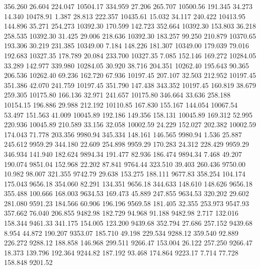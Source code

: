  356.260   26.604  224.047     10504.17
 334.959   27.206  265.707     10500.56
 191.345   34.273   14.340     10478.91
   1.387   28.813  222.357     10435.61
  15.032   34.117  240.422     10413.95
 144.896   35.271  254.273     10392.30
 170.599  142.723  352.664     10392.30
 153.803   36.218  258.535     10392.30
  31.425   29.006  218.636     10392.30
 183.257   99.250  210.879     10370.65
 193.306   30.219  231.385     10349.00
   7.184  148.226  181.307     10349.00
 179.039   79.016  192.683     10327.35
 178.789   20.084  233.700     10327.35
   7.085  152.146  169.272     10284.05
  33.289  142.977  339.980     10284.05
  30.920   38.716  204.351     10262.40
 195.643   90.365  206.536     10262.40
  69.236  162.720   67.936     10197.45
 207.107   32.503  212.952     10197.45
 351.386   42.070  241.759     10197.45
 351.790  147.438  343.352     10197.45
 160.819   38.679  259.305     10175.80
 166.136   32.971  241.657     10175.80
 346.664   33.636  258.188     10154.15
 196.886   29.988  212.192     10110.85
 167.830  155.167  144.054     10067.54
  53.497  151.563   41.009     10045.89
 192.186  149.356  158.131     10045.89
 169.312   52.995  220.936     10045.89
 210.589   33.156   32.058     10002.59
  24.229  152.027  202.382     10002.59
 174.043   71.778  203.356      9980.94
 345.334  148.161  146.565      9980.94
   1.536   25.887  245.612      9959.29
 344.180   22.609  254.898      9959.29
 170.283   24.312  228.429      9959.29
 346.934  141.940  182.624      9894.34
 191.477   82.936  186.474      9894.34
   7.468   49.207  190.074      9851.04
 152.968   22.202   87.841      9764.44
 323.510   39.403  260.436      9750.00
  10.982   98.007  321.355      9742.79
  29.638  153.275  188.111      9677.83
 358.254  104.174  175.043      9656.18
 354.060   82.291  134.351      9656.18
 344.633  148.610  148.626      9656.18
 355.488  100.666  168.003      9634.53
 169.473   45.889  247.855      9634.53
 320.202   29.602  281.080      9591.23
 184.566   60.906  196.196      9569.58
 181.405   32.355  253.973      9547.93
 357.662   76.040  206.855      9482.98
 182.729   94.968   91.188      9482.98
   2.717  132.016  158.344      9461.33
 341.175  154.005  123.200      9439.68
 352.794   27.686  257.152      9439.68
   8.954   44.872  190.207      9353.07
 185.710   49.198  229.534      9288.12
 359.540   92.889  226.272      9288.12
 188.858  146.968  299.511      9266.47
 153.004   26.122  257.250      9266.47
  18.373  139.796  192.364      9244.82
 187.192   93.468  174.864      9223.17
   7.714   77.728  158.848      9201.52
